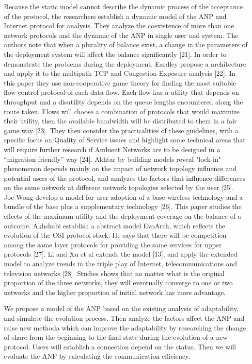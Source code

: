 \documentclass{article}
\begin{document}
Because the static model cannot describe the dynamic process of the acceptance of the protocol, the researchers establish
a dynamic model of the ANP and Internet protocol for analysis. They analyze the coexistence of more than one network
protocols and the dynamic of the ANP in single user and system. The authors note that when a plurality of balance
exist, a change in the parameters of the deployment system will affect the balance significantly [21].
In order to demonstrate the problems during the deployment, Eardley propose a architecture and apply it to the multipath
TCP and Congestion Exposure analysis [22]. In this paper they use non-cooperative game theory for finding the most
suitable flow control protocol of each data flow. Each flow has a utility that depends on throughput and a
disutility depends on the queue lengths encountered along the route taken. Flows will choose a combination of protocols
that would maximize their utility, then the available bandwidth will be distributed to them in a fair game way [23].
They then consider the practicalities of these guidelines, with a specific focus on Quality of Service issues and
highlight some technical areas that will require further research if Ambient Networks are to be designed in a “migration
friendly” way [24]. Akhtar by building models reveal "lock-in" phenomenon depends mainly on the impact of network topology
influence and potential users of the protocol, and analyzes
the factors that influence differences on the same network at different network topologies selected by the user [25].
Joe-Wong develop a model for user adoption of a base wireless technology and a bundle of the base plus a supplementary
technology [26]. This paper studies the effects of the maximum utility and the deployment coverage on the balance of a
outcome. Akhshabi establish a abstract model EvoArch, which reflects the evolution of the OSI protocol stack. He says
that there will be competition among the same layer protocols for providing the same services for upper protocols [27].
Li and Xu et al extends the model [13], and apply the extended model to analyze trends in the triple play of Internet,
telecommunications and television networks [28]. Studies shows that no matter what is the original proportion of the
three networks, they will eventually converge to one or two networks and the higher proportion of initial network
has more advantage.

We propose a model of the ANP based on the existing analysis of adaptability, and simulate the evolution process.
Then analyze the factors affect the ANP and raise new methoda which can improve the adaptability by researching
the change of share from the beginning to the final state during the evolution of a new protocol. Users will
establish a connection depend on the status. Then we will evaluate the ANP by calculating the communication efficiency.
\end{document}

